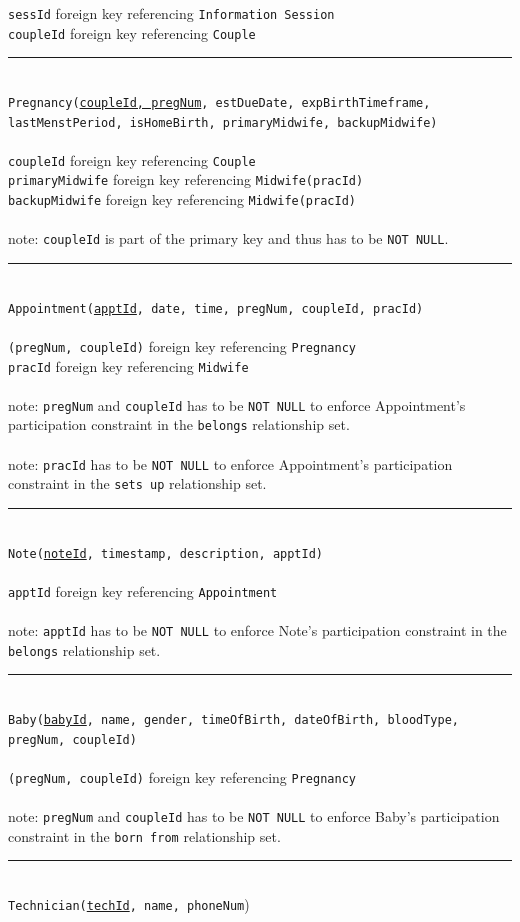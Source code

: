 \documentclass[10pt, letterpaper]{article}
\newcommand{\code}[1]{\texttt{#1}}
\newcommand{\dline}{\par\noindent\rule{\textwidth}{0.2pt}\\}
\begin{document}
\noindent\code{sessId} foreign key referencing \code{Information Session}\\
\code{coupleId} foreign key referencing \code{Couple}
\dline
\code{Pregnancy(\underline{coupleId, pregNum}, estDueDate, expBirthTimeframe, lastMenstPeriod, isHomeBirth, primaryMidwife, backupMidwife)}\\
\\
\code{coupleId} foreign key referencing \code{Couple}\\
\code{primaryMidwife} foreign key referencing \code{Midwife(pracId)}\\
\code{backupMidwife} foreign key referencing \code{Midwife(pracId)}\\
\\
note: \code{coupleId} is part of the primary key and thus has to be \code{NOT NULL}.
\dline
\code{Appointment(\underline{apptId}, date, time, pregNum, coupleId, pracId)}\\
\\
\code{(pregNum, coupleId)} foreign key referencing \code{Pregnancy}\\
\code{pracId} foreign key referencing \code{Midwife}\\
\\
note: \code{pregNum} and \code{coupleId} has to be \code{NOT NULL} to enforce Appointment's participation constraint in the \code{belongs} relationship set.\\
\\
note: \code{pracId} has to be \code{NOT NULL} to enforce Appointment's participation constraint in the \code{sets up} relationship set.
\dline
\code{Note(\underline{noteId}, timestamp, description, apptId)}\\
\\
\code{apptId} foreign key referencing \code{Appointment}\\
\\
note: \code{apptId} has to be \code{NOT NULL} to enforce Note's participation constraint in the \code{belongs} relationship set.
\dline
\code{Baby(\underline{babyId}, name, gender, timeOfBirth, dateOfBirth, bloodType, pregNum, coupleId)}\\
\\
\code{(pregNum, coupleId)} foreign key referencing \code{Pregnancy}\\
\\
note: \code{pregNum} and \code{coupleId} has to be \code{NOT NULL} to enforce Baby's participation constraint in the \code{born from} relationship set.
\dline
\code{Technician(\underline{techId}, name, phoneNum})
\end{document}
